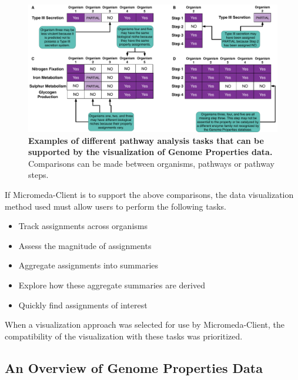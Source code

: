 \begin{figure}[!ht]
  \centering
	\includegraphics[width=\textwidth]{media/analysis_types.pdf}
	 \caption[Examples of different pathway analysis tasks that can be supported by 
the visualization of Genome Properties data.]{\textbf{Examples of different 
pathway analysis tasks that can be supported by the visualization of Genome 
Properties data.} Comparisons can be made between 
organisms, pathways or pathway steps.}
	 \label{fig:client-analysis-types}
\end{figure}

If Micromeda-Client is to support the above comparisons, the data visualization 
method used must allow users to perform the following tasks.

\begin{itemize}
\item Track assignments across organisms
\item Assess the magnitude of assignments
\item Aggregate assignments into summaries
\item Explore how these aggregate summaries are derived
\item Quickly find assignments of interest
\end{itemize}

When a visualization approach was selected for use by Micromeda-Client, the 
compatibility of the visualization with these tasks was prioritized.

\subsection{An Overview of Genome Properties Data}

